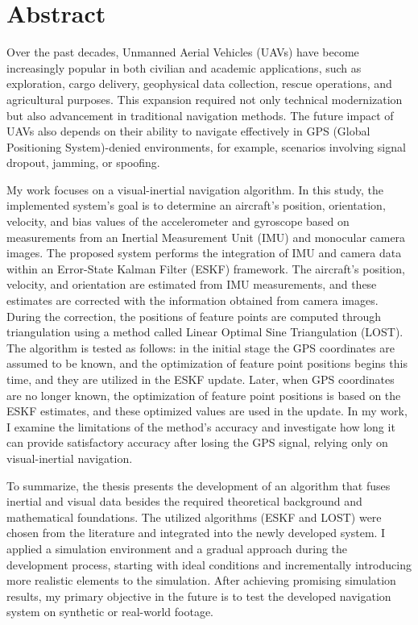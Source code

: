 \selectthesislanguage{}
\chapter*{Abstract}

Over the past decades, Unmanned Aerial Vehicles (UAVs) have become increasingly popular in both civilian and academic applications, such as exploration, cargo delivery, geophysical data collection, rescue operations, and agricultural purposes. This expansion required not only technical modernization but also advancement in traditional navigation methods. The future impact of UAVs also depends on their ability to navigate effectively in GPS (Global Positioning System)-denied environments, for example, scenarios involving signal dropout, jamming, or spoofing.

My work focuses on a visual-inertial navigation algorithm. In this study, the implemented system’s goal is to determine an aircraft's position, orientation, velocity, and bias values of the accelerometer and gyroscope based on measurements from an Inertial Measurement Unit (IMU) and monocular camera images. The proposed system performs the integration of IMU and camera data within an Error-State Kalman Filter (ESKF) framework. The aircraft’s position, velocity, and orientation are estimated from IMU measurements, and these estimates are corrected with the information obtained from camera images. During the correction, the positions of feature points are computed through triangulation using a method called Linear Optimal Sine Triangulation (LOST). The algorithm is tested as follows: in the initial stage the GPS coordinates are assumed to be known, and the optimization of feature point positions begins this time, and they are utilized in the ESKF update. Later, when GPS coordinates are no longer known, the optimization of feature point positions is based on the ESKF estimates, and these optimized values are used in the update. In my work, I examine the limitations of the method's accuracy and investigate how long it can provide satisfactory accuracy after losing the GPS signal, relying only on visual-inertial navigation.

To summarize, the thesis presents the development of an algorithm that fuses inertial and visual data besides the required theoretical background and mathematical foundations. The utilized algorithms (ESKF and LOST) were chosen from the literature and integrated into the newly developed system. I applied a simulation environment and a gradual approach during the development process, starting with ideal conditions and incrementally introducing more realistic elements to the simulation. After achieving promising simulation results, my primary objective in the future is to test the developed navigation system on synthetic or real-world footage.